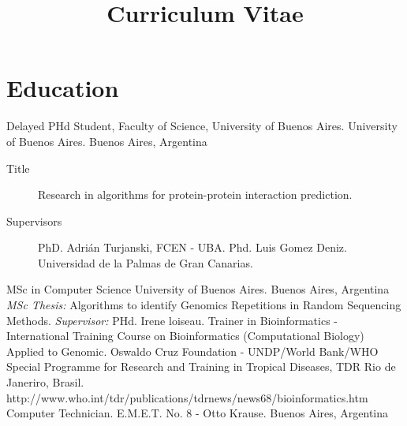 
\newcommand{\Q}{{\textsf{Q}\hspace*{-1.1ex}%
  \rule{0.15ex}{1.5ex}\hspace*{1.1ex}}}
\newcommand{\Cuat}{º\Q~}
\newcommand{\actual}{$\infty$}


\title{Curriculum Vitae}


\newcommand{\DC}{Computer Department}
\newcommand{\FCEN}{Faculty of Science}
\newcommand{\UBA}{University of Buenos Aires}
\newcommand{\CS}{MSc in Computer Science}



\makecvtitle

\section{Education}\label{otros:desde}

	{Delayed PHd Student, \FCEN, \UBA.}
	{\UBA.}
	{Buenos Aires, Argentina}
	{}
	{\begin{description}
	\item [Title] Research in algorithms for protein-protein interaction prediction.
	\item [Supervisors] PhD. Adrián Turjanski, FCEN - UBA. Phd. Luis Gomez Deniz. Universidad de la Palmas de Gran Canarias.
	\end{description}}
	{\CS}
	{\UBA.}
	{Buenos Aires, Argentina}
	{}
	{\emph{MSc Thesis:} Algorithms to identify Genomics Repetitions in Random Sequencing Methods. \emph{Supervisor:} PHd. Irene loiseau.}
	{Trainer in Bioinformatics - International Training Course on Bioinformatics (Computational Biology) Applied to Genomic.}
	{Oswaldo Cruz Foundation - UNDP/World Bank/WHO Special Programme for Research and Training in Tropical Diseases, TDR}
	{Rio de Janeriro, Brasil.}
	{}
	{http://www.who.int/tdr/publications/tdrnews/news68/bioinformatics.htm}
	{Computer Technician.}
	{E.M.E.T. No. 8 - Otto Krause.}
	{Buenos Aires, Argentina}
	{}
	{}

